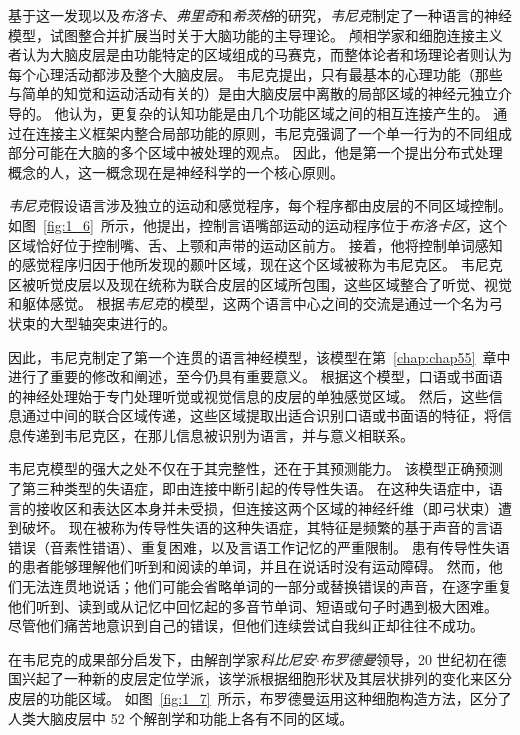 基于这一发现以及\textit{布洛卡}、\textit{弗里奇}和\textit{希茨格}的研究，\textit{韦尼克}制定了一种语言的神经模型，试图整合并扩展当时关于大脑功能的主导理论。
颅相学家和细胞连接主义者认为大脑皮层是由功能特定的区域组成的马赛克，而整体论者和场理论者则认为每个心理活动都涉及整个大脑皮层。
韦尼克提出，只有最基本的心理功能（那些与简单的知觉和运动活动有关的）是由大脑皮层中离散的局部区域的神经元独立介导的。
他认为，更复杂的认知功能是由几个功能区域之间的相互连接产生的。
通过在连接主义框架内整合局部功能的原则，韦尼克强调了一个单一行为的不同组成部分可能在大脑的多个区域中被处理的观点。
因此，他是第一个提出分布式处理概念的人，这一概念现在是神经科学的一个核心原则。




\textit{韦尼克}假设语言涉及独立的运动和感觉程序，每个程序都由皮层的不同区域控制。
如图~\ref{fig:1_6}~所示，他提出，控制言语嘴部运动的运动程序位于\textit{布洛卡区}，这个区域恰好位于控制嘴、舌、上颚和声带的运动区前方。
接着，他将控制单词感知的感觉程序归因于他所发现的颞叶区域，现在这个区域被称为韦尼克区。
韦尼克区被听觉皮层以及现在统称为联合皮层的区域所包围，这些区域整合了听觉、视觉和躯体感觉。
根据\textit{韦尼克}的模型，这两个语言中心之间的交流是通过一个名为弓状束的大型轴突束进行的。



因此，韦尼克制定了第一个连贯的语言神经模型，该模型在第~\ref{chap:chap55}~章中进行了重要的修改和阐述，至今仍具有重要意义。
根据这个模型，口语或书面语的神经处理始于专门处理听觉或视觉信息的皮层的单独感觉区域。
然后，这些信息通过中间的联合区域传递，这些区域提取出适合识别口语或书面语的特征，将信息传递到韦尼克区，在那儿信息被识别为语言，并与意义相联系。




韦尼克模型的强大之处不仅在于其完整性，还在于其预测能力。
该模型正确预测了第三种类型的失语症，即由连接中断引起的传导性失语。
在这种失语症中，语言的接收区和表达区本身并未受损，但连接这两个区域的神经纤维（即弓状束）遭到破坏。
现在被称为传导性失语的这种失语症，其特征是频繁的基于声音的言语错误（音素性错语）、重复困难，以及言语工作记忆的严重限制。
患有传导性失语的患者能够理解他们听到和阅读的单词，并且在说话时没有运动障碍。
然而，他们无法连贯地说话；他们可能会省略单词的一部分或替换错误的声音，在逐字重复他们听到、读到或从记忆中回忆起的多音节单词、短语或句子时遇到极大困难。
尽管他们痛苦地意识到自己的错误，但他们连续尝试自我纠正却往往不成功。





在韦尼克的成果部分启发下，由解剖学家\textit{科比尼安$\cdot$布罗德曼}领导，20 世纪初在德国兴起了一种新的皮层定位学派，该学派根据细胞形状及其层状排列的变化来区分皮层的功能区域。
如图~\ref{fig:1_7}~所示，布罗德曼运用这种细胞构造方法，区分了人类大脑皮层中 52 个解剖学和功能上各有不同的区域。




